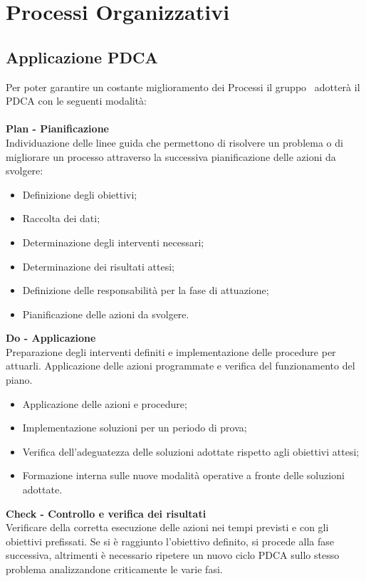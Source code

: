 \section{Processi Organizzativi}
\subsection{Applicazione PDCA}
Per poter garantire un costante miglioramento dei Processi il gruppo \gruppo\ adotterà il PDCA con le seguenti modalità:\\\\
\textbf{Plan - Pianificazione}\\
Individuazione delle linee guida che permettono di risolvere un problema o di migliorare un processo attraverso la successiva pianificazione delle azioni da svolgere:
\begin{itemize}
\item Definizione degli obiettivi;
\item Raccolta dei dati;
\item Determinazione degli interventi necessari;
\item Determinazione dei risultati attesi;
\item Definizione delle responsabilità per la fase di attuazione;
\item Pianificazione delle azioni da svolgere.
\end{itemize}
\textbf{Do - Applicazione}\\
Preparazione degli interventi definiti e implementazione delle procedure per attuarli. Applicazione delle azioni programmate e verifica del funzionamento del piano.
\begin{itemize}
\item Applicazione delle azioni e procedure;
\item Implementazione soluzioni per un periodo di prova;
\item Verifica dell'adeguatezza delle soluzioni adottate rispetto agli obiettivi attesi;
\item Formazione interna sulle nuove modalità operative a fronte delle soluzioni adottate.\\
\end{itemize}
\textbf{Check - Controllo e verifica dei risultati}\\
Verificare della corretta esecuzione delle azioni nei tempi previsti e con gli obiettivi prefissati.
Se si è raggiunto l’obiettivo definito, si procede alla fase successiva, altrimenti è necessario ripetere un nuovo ciclo PDCA sullo stesso problema analizzandone criticamente le varie fasi.

